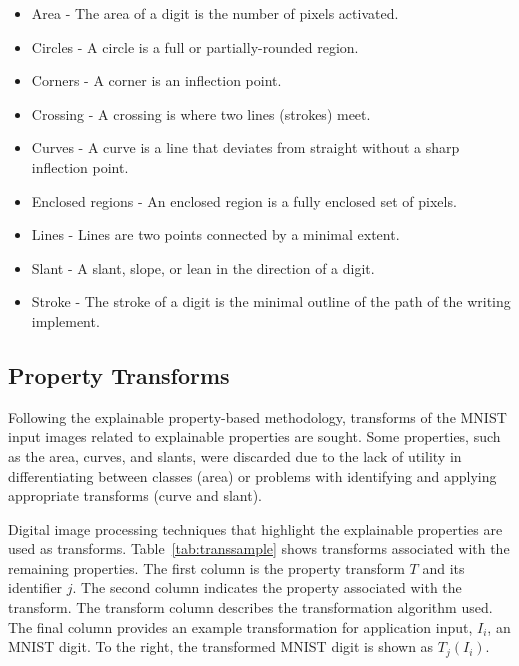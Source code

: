 \begin{itemize}
    \item Area - The area of a digit is the number of pixels activated.
    \item Circles - A circle is a full or partially-rounded region.
    \item Corners - A corner is an inflection point.
    \item Crossing - A crossing is where two lines (strokes) meet.
    \item Curves - A curve is a line that deviates from straight without a sharp inflection point.
    \item Enclosed regions - An enclosed region is a fully enclosed set of pixels.
    \item Lines - Lines are two points connected by a minimal extent.
    \item Slant - A slant, slope, or lean in the direction of a digit.
    \item Stroke - The stroke of a digit is the minimal outline of the path of the writing implement.
\end{itemize}

\subsection{Property Transforms}

Following the explainable property-based methodology, transforms of the MNIST
input images related to explainable properties are sought. Some properties, such
as the area, curves, and slants, were discarded due to the lack of utility in
differentiating between classes (area) or problems with identifying and applying
appropriate transforms (curve and slant).

Digital image processing techniques that highlight the explainable properties
are used as transforms. Table~\ref{tab:transsample} shows transforms associated
with the remaining properties. The first column is the property transform $T$
and its identifier $j$. The second column indicates the property associated with
the transform. The transform column describes the transformation algorithm used.
The final column provides an example transformation for application input,
$I_i$, an MNIST digit. To the right, the transformed MNIST digit is shown as
$T_j(I_i)$.

